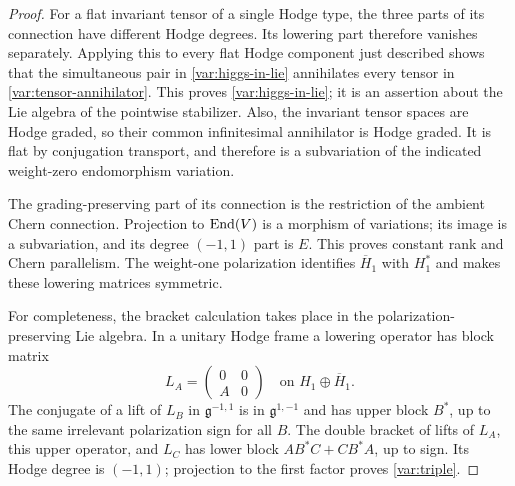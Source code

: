 \begin{proof}
For a flat invariant tensor of a single Hodge type, the three parts
of its connection have different Hodge degrees.  Its lowering part
therefore vanishes separately.  Applying this to every flat Hodge
component just described shows that the simultaneous pair in
\eqref{var:higgs-in-lie} annihilates every tensor in
\eqref{var:tensor-annihilator}.  This proves
\eqref{var:higgs-in-lie}; it is an assertion about the Lie algebra of
the pointwise stabilizer.  Also, the invariant tensor spaces are
Hodge graded, so their common infinitesimal annihilator is Hodge
graded.  It is flat by conjugation transport, and therefore is a
subvariation of the indicated weight-zero endomorphism variation.

The grading-preserving part of its connection is the restriction of
the ambient Chern connection.  Projection to $\operatorname{End}(V)$ is a morphism
of variations; its image is a subvariation, and its degree $(-1,1)$
part is $E$.  This proves constant rank and Chern parallelism.  The
weight-one polarization identifies $\overline H_1$ with $H_1^*$ and
makes these lowering matrices symmetric.

For completeness, the bracket calculation takes place in the
polarization-preserving Lie algebra.  In a unitary Hodge frame a
lowering operator has block matrix
\[
 L_A=\begin{pmatrix}0&0\\ A&0\end{pmatrix}
       \quad\text{on }H_1\oplus\overline H_1.
\]
The conjugate of a lift of $L_B$ in $\mathfrak g^{-1,1}$ is in
$\mathfrak g^{1,-1}$ and has upper block $B^*$, up to the same
irrelevant polarization sign for all $B$.  The double bracket of
lifts of $L_A$, this upper operator, and $L_C$ has lower block
$AB^*C+CB^*A$, up to sign.  Its Hodge degree is $(-1,1)$; projection
to the first factor proves \eqref{var:triple}.
\end{proof}

